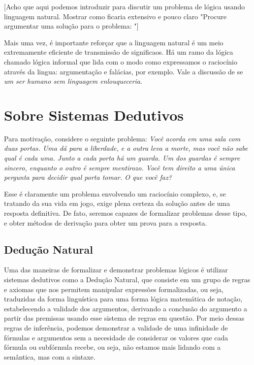 [Acho que aqui podemos introduzir para discutir um problema de lógica usando linguagem natural. Mostrar como ficaria extensivo e pouco claro "Procure argumentar uma solução para o problema: "]

Mais uma vez, é importante reforçar que a linguagem natural é um meio extremamente eficiente de transmissão de significaos.
Há um ramo da lógica chamado lógica informal que lida com o modo como expressamos o raciocínio através da lingua: argumentação e falácias, por exemplo.
Vale a discussão de se \textit{um ser humano sem linguagem enlouqueceria}.

\section{Sobre Sistemas Dedutivos}
Para motivação, considere o seguinte problema: \textit{Você acorda em uma sala com duas portas. Uma dá para a liberdade, e a outra leva a morte, mas você não sabe qual é cada uma.
Junto a cada porta há um guarda. Um dos guardas é sempre sincero, enquanto o outro é sempre mentirozo. Você tem direito a uma única pergunta para decidir qual porta tomar. O que você faz?}

Esse é claramente um problema envolvendo um raciocínio complexo, e, se tratando da sua vida em jogo, exige plena certeza da solução antes de uma resposta definitiva.
De fato, seremos capazes de formalizar problemas desse tipo, e obter métodos de derivação para obter um prova para a resposta.

\subsection{Dedução Natural}
Uma das maneiras de formalizar e demonstrar problemas lógicos é utilizar sistemas dedutivos como a Dedução Natural, que consiste em um grupo de regras e axiomas que nos permitem manipular expressões formalizadas, ou seja, traduzidas da forma linguística para uma forma lógica matemática de notação, estabelecendo a validade dos argumentos, derivando a conclusão do argumento a partir das premissas usando esse sistema de regras em questão. Por meio dessas regras de inferência, podemos demonstrar a validade de uma infinidade de fórmulas e argumentos sem a necesidade de considerar os valores que cada fórmula ou subfórmula recebe, ou seja, não estamos mais lidando com a semântica, mas com a sintaxe.


